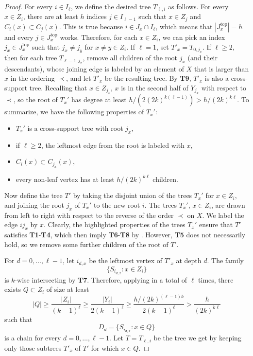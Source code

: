 \documentclass[11pt]{article}
\theoremstyle{definition}
\begin{document}
\begin{proof}
For every $i\in I_{\ell}$, we define the desired tree $T_{\ell,i}$ as follows. For every $x\in Z_i$, there are at least $h$ indices $j\in I_{\ell-1}$ such that $x\in Z_j$ and $C_i(x)\subset C_j(x)$. This is true because $i\in J_x\cap I_{\ell}$, which means that $|J_x^{\text{top}}|=h$ and every $j\in J_x^{\text{top}}$ works. Therefore, for each $x\in Z_i$, we can pick an index $j_x\in J_x^{\text{top}}$ such that $j_x\neq j_y$ for $x\neq y\in Z_i$. If $\ell=1$, set $T'_x=T_{0,j_x}$. If $\ell\geq 2$, then for each tree $T_{\ell-1,j_x}$, remove all children of the root $j_x$ (and their descendants), whose joining edge is labeled by an element of $X$ that is larger than $x$ in the ordering $\prec$, and let $T'_{x}$ be the resulting tree. By \textbf{T9}, $T'_x$ is also a cross-support tree. Recalling that $x\in Z_{j_x}$, $x$ is in the second half of $Y_{j_x}$ with respect to $\prec$, so the root of $T_{x}'$ has degree at least $h/(2(2k)^{k(\ell-1)})>h/(2k)^{k\ell}$. To summarize, we have the following properties of $T_x'$:
\begin{itemize}
    \item $T_{x}'$ is a cross-support tree with root $j_x$,
    \item if $\ell\geq 2$, the leftmost edge from the root is labeled with  $x$,
    \item $C_i(x)\subset C_{j_x}(x)$,
    \item every non-leaf vertex has at least $h/(2k)^{k\ell}$ children. 
\end{itemize}

Now define the tree $T'$ by taking the disjoint union of the trees $T_{x}'$ for $x\in Z_i$, and joining the root $j_x$ of $T_x'$ to the new root $i$. The trees $T_{x}'$, $x\in Z_i$, are drawn from left to right with respect to the reverse of the order $\prec$ on $X$.  We label the edge $ij_x$ by $x$. Clearly, the highlighted properties of the trees $T_x'$ ensure that $T'$ satisfies \textbf{T1}-\textbf{T4}, which then imply \textbf{T6}-\textbf{T8} by . However, \textbf{T5} does not necessarily hold, so we remove some further children of the root of $T'$.

 For $d=0,\dots,\ell-1$, let $i_{d,x}$ be the leftmost vertex of $T'_x$ at depth $d$. The family 
$$\{S_{i_{d,x}}:x\in Z_i\}$$ is $k$-wise intersecting by \textbf{T7}. Therefore, applying  in a total of $\ell$ times, there exists $Q\subset Z_i$ of size at least 
$$|Q|\geq \frac{|Z_i|}{(k-1)^{\ell}}\geq \frac{|Y_i|}{2(k-1)^{\ell}}\geq \frac{h/(2k)^{(\ell-1) k}}{2(k-1)^{\ell}}>\frac{h}{(2k)^{k\ell}}$$
such that $$D_d=\{S_{i_{d,x}}:x\in Q\}$$ is a chain for every $d=0,\dots,\ell-1$. Let $T=T_{\ell,i}$ be the tree we get by keeping only those subtrees $T'_x$ of $T'$ for which $x\in Q$. 


\end{proof}
\end{document}
